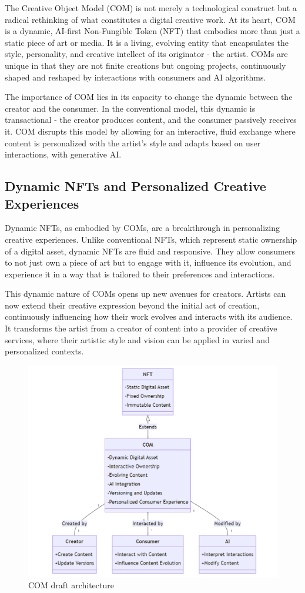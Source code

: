 \documentclass[12pt,a4paper]{article}
\begin{document}
The Creative Object Model (COM) is not merely a technological construct but a radical rethinking of what constitutes a digital creative work. At its heart, COM is a dynamic, AI-first Non-Fungible Token (NFT) that embodies more than just a static piece of art or media. It is a living, evolving entity that encapsulates the style, personality, and creative intellect of its originator - the artist. COMs are unique in that they are not finite creations but ongoing projects, continuously shaped and reshaped by interactions with consumers and AI algorithms.

The importance of COM lies in its capacity to change the dynamic between the creator and the consumer. In the conventional model, this dynamic is transactional - the creator produces content, and the consumer passively receives it. COM disrupts this model by allowing for an interactive, fluid exchange where content is personalized with the artist's style and adapts based on user interactions, with generative AI.

\subsection{Dynamic NFTs and Personalized Creative Experiences}

Dynamic NFTs, as embodied by COMs, are a breakthrough in personalizing creative experiences. Unlike conventional NFTs, which represent static ownership of a digital asset, dynamic NFTs are fluid and responsive. They allow consumers to not just own a piece of art but to engage with it, influence its evolution, and experience it in a way that is tailored to their preferences and interactions.

This dynamic nature of COMs opens up new avenues for creators. Artists can now extend their creative expression beyond the initial act of creation, continuously influencing how their work evolves and interacts with its audience. It transforms the artist from a creator of content into a provider of creative services, where their artistic style and vision can be applied in varied and personalized contexts.

\begin{figure}
    \centering
    \includegraphics[width=0.8\linewidth]{create_2.png}
    \caption{COM draft architecture}
    \label{fig:com-architecture}
\end{figure}
\end{document}
